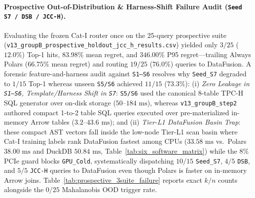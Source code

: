 \documentclass[10pt,a4paper]{article}
\begin{document}
\paragraph{Prospective Out-of-Distribution \& Harness-Shift Failure Audit (\texttt{Seed S7 / DSB / JCC-H}).} Evaluating the frozen Cat-I router once on the 25-query prospective suite (\texttt{v13\_\allowbreak{}groupB\_\allowbreak{}prospective\_\allowbreak{}holdout\_\allowbreak{}jcc\_\allowbreak{}h\_\allowbreak{}results.csv}) yielded only $3/25$ ($12.0\%$) Top-1 hits, $83.98\%$ mean regret, and $346.00\%$ P95 regret—trailing Always Polars ($66.75\%$ mean regret) and routing $19/25$ ($76.0\%$) queries to DataFusion. A forensic feature-and-harness audit against \texttt{S1--S6} resolves why \texttt{Seed\_S7} degraded to $1/15$ Top-1 whereas unseen \texttt{S5/S6} achieved $11/15$ ($73.3\%$): (i) \emph{Zero Leakage in \texttt{S1--S6}, Template/Harness Shift in \texttt{S7}}: \texttt{S5/S6} used the canonical 8-table TPC-H SQL generator over on-disk storage ($50\text{--}184\text{ ms}$), whereas \texttt{v13\_groupB\_step2} authored compact 1-to-2 table SQL queries executed over pre-materialized in-memory Arrow tables ($3.2\text{--}43.6\text{ ms}$); and (ii) \emph{Tier-L1 DataFusion Basin Trap}: these compact AST vectors fall inside the low-node Tier-L1 scan basin where Cat-I training labels rank DataFusion fastest among CPUs ($33.58\text{ ms}$ vs.\ Polars $38.00\text{ ms}$ and DuckDB $50.84\text{ ms}$, Table~\ref{tab:six_software_matrix}) while the $8\%$ PCIe guard blocks \texttt{GPU\_Cold}, systematically dispatching $10/15$ \texttt{Seed\_S7}, $4/5$ \texttt{DSB}, and $5/5$ \texttt{JCC-H} queries to DataFusion even though Polars is faster on in-memory Arrow joins. Table~\ref{tab:prospective_3suite_failure} reports exact $k/n$ counts alongside the $0/25$ Mahalanobis OOD trigger rate.
\end{document}
